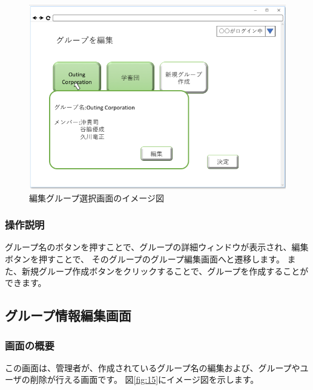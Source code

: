 \begin{figure}[htbp]
\begin{center}
  \includegraphics[width=1\linewidth,clip]{./img/14.png}
  \caption{編集グループ選択画面のイメージ図}\label{fig:14}
\end{center}
\end{figure}

\subsubsection{操作説明}
グループ名のボタンを押すことで、グループの詳細ウィンドウが表示され、編集ボタンを押すことで、
そのグループのグループ編集画面へと遷移します。
また、新規グループ作成ボタンをクリックすることで、グループを作成することができます。

\newpage

\subsection{グループ情報編集画面}
\subsubsection{画面の概要}
この画面は、管理者が、作成されているグループ名の編集および、グループやユーザの削除が行える画面です。
図\ref{fig:15}にイメージ図を示します。

